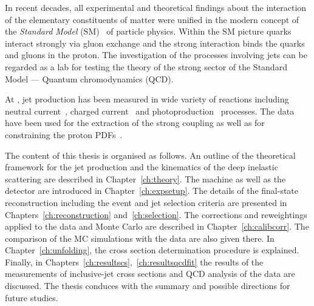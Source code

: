 In recent decades, all experimental and theoretical findings about the interaction of the elementary constituents of matter were unified in the modern concept of the \emph{Standard Model} (SM)~\cite{PDG:2014} of particle physics. Within the SM picture quarks interact strongly via gluon exchange and the strong interaction binds the quarks and gluons in the proton. The investigation of the processes involving jets can be regarded as a lab for testing the theory of the strong sector of the Standard Model --- Quantum chromodynamics (QCD).

At \hera, jet production has been measured in wide variety of reactions including neutral current~\cite{epj:c19:289,pl:b547:164,pl:b551:226,np:b765:1,pl:b649:12,epj:c65:363,epj:c67:1,pl:b507:70,epj:c23:13,pl:b515:17,epj:c44:183,pr:d85:052008}, charged current~\cite{epj:c31:149,pr:d78:032004} and photoproduction~\cite{pl:b560:7,epj:c29:497,epj:c11:35,epj:c23:615,pl:b531:9,epj:c25:13,pl:b639:21,pr:d76:072011,pl:b443:394,np:b792:1} processes. The data have been used for the extraction of the strong coupling as well as for constraining the proton PDFs~\cite{epj:c42:1}.

The content of this thesis is organised as follows. An outline of the theoretical framework for the jet production and the kinematics of the deep inelastic scattering are described in Chapter~\ref{ch:theory}. The \hera machine as well as the \zeus detector are introduced in Chapter~\ref{ch:expsetup}. The details of the final-state reconstruction including the event and jet selection criteria are presented in Chapters~\ref{ch:reconstruction} and~\ref{ch:selection}. The corrections and reweightings applied to the data and Monte Carlo are described in Chapter~\ref{ch:calibcorr}. The comparison of the MC simulations with the data are also given there. In Chapter~\ref{ch:unfolding}, the cross section determination procedure is explained. Finally, in Chapters~\ref{ch:resultscs},~\ref{ch:resultsqcdfit} the results of the measurements of inclusive-jet cross sections and QCD analysis of the data are discussed. The thesis conduces with the summary and possible directions for future studies.